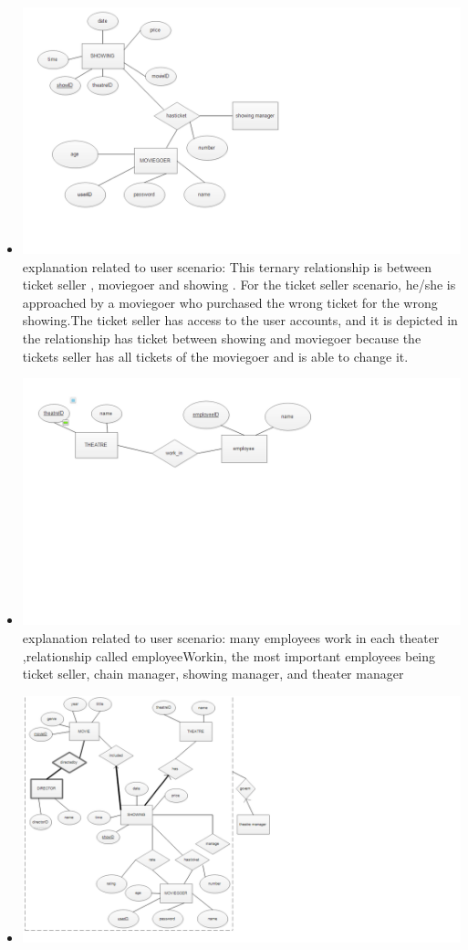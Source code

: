 {\begin{itemize}
explanation related to user scenario: moviegoer can rate showing , each of their attributes allow a user to rate a showing by movie ID 
\item{ }
\includegraphics[scale=0.3]{MoviegoerhasticketShowing.png}
explanation related to user scenario: This ternary relationship is between ticket seller  , moviegoer and showing . For the ticket seller scenario, he/she is approached by a moviegoer who purchased the wrong ticket for the wrong showing.The ticket seller has access to the user accounts, and it is depicted in the relationship has ticket between showing and moviegoer because the tickets seller has all tickets of the moviegoer and is able to change it.
\item{ }
\includegraphics[scale=0.3]{TheatrehasEmployee.png}
explanation related to user scenario: many employees work in each theater ,relationship called employeeWorkin, the most important employees being ticket seller, chain manager, showing manager, and theater manager
\item{ }
\includegraphics[scale=0.3]{theatremanagergovern.png}

\end{itemize}}
